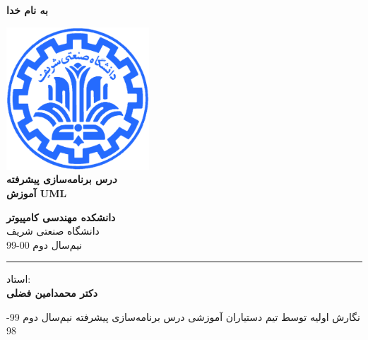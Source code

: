 \documentclass[]{article}
\begin{document}
\begin{titlepage}
\begin{center}

\textbf{ \Huge{به نام خدا} }
        
\vspace{0.2cm}

\includegraphics[width=0.4\textwidth]{sharif1.png}\\
\vspace{0.2cm}
\textbf{ \Huge{\emph درس برنامه‌سازی پیشرفته} }\\
\vspace{0.25cm}
\textbf{ \Large{آموزش UML} }
\vspace{0.2cm}
       
 
           \large \textbf{دانشکده مهندسی کامپیوتر}\\\vspace{0.1cm}
     \large   دانشگاه صنعتی شریف\\\vspace{0.2cm}
     \large   ﻧﯿﻢ‌سال دوم 00-99 \\\vspace{0.10cm}
     \noindent\rule[1ex]{\linewidth}{1pt}
     استاد:\\
     \textbf{{دکتر محمدامین فضلی}}
     
   


نگارش اولیه توسط تیم دستیاران آموزشی درس برنامه‌‌سازی پیشرفته نیم‌سال دوم 99-98
      

\end{center}
\end{titlepage}


\newpage
\pagestyle{fancy}
\fancyhf{}
\fancyfoot{}
\cfoot{\thepage}
\renewcommand{\headrulewidth}{2pt}
\end{document}
